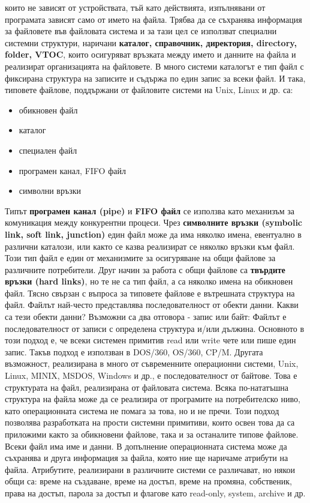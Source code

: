 \documentclass{article}
\begin{document}
които не зависят от устройствата, тъй като действията, изпълнявани от програмата зависят само от името на файла.
Трябва да се съхранява информация за файловете във файловата система и за тази цел се използват специални
системни структури, наричани \textbf{каталог, справочник, директория, directory, folder, VTOC}, които осигуряват
връзката между името и данните на файла и реализират организацията на файловете. В много системи каталогът е
тип файл с фиксирана структура на записите и съдържа по един запис за всеки файл.
И така, типовете файлове, поддържани от файловите системи на Unix, Linux и др. са:
\begin{itemize}
    \item обикновен файл
    \item каталог
    \item специален файл
    \item програмен канал, FIFO файл
    \item символни връзки
\end{itemize}
Типът \textbf{програмен канал (pipe)} и \textbf{FIFO файл} се използва като механизъм за комуникация между конкурентни процеси.
Чрез \textbf{символните връзки (symbolic link, soft link, junction)} един файл може да има няколко имена, евентуално в различни
каталози, или както се казва реализират се няколко връзки към файл. Този тип файл е един от механизмите за осигуряване на общи
файлове за различните потребители. Друг начин за работа с общи файлове са \textbf{твърдите връзки (hard links)}, но те не са тип
файл, а са няколко имена на обикновен файл. Тясно свързан с въпроса за типовете файлове е вътрешната структура на файл. Файлът
най-често представлява последователност от обекти данни. Какви са тези обекти данни? Възможни са два отговора - запис или байт:
Файлът е последователност от записи с определена структура и/или дължина. Основното в този подход е, че всеки системен примитив
read или write чете или пише един запис. Такъв подход е използван в DOS/360, OS/360, CP/M. Другата възможност, реализирана в
много от съвременните операционни системи, Unix, Linux, MINIX, MSDOS, Windows и др., е последователност от байтове. Това е
структурата на файл, реализирана от файловата система. Всяка по-нататъшна структура на файла може да се реализира от програмите
на потребителско ниво, като операционната система не помага за това, но и не пречи. Този подход позволява разработката на прости
системни примитиви, които освен това да са приложими както за обикновени файлове, така и за останалите типове файлове. Всеки
файл има име и данни. В допълнение операционната система може да съхранява и друга информация за файла, която ние ще наричаме
атрибути на файла. Атрибутите, реализирани в различните системи се различават, но някои общи са: време на създаване, време на
достъп, време на промяна, собственик, права на достъп, парола за достъп и флагове като read-only, system, archive и др.
\end{document}
